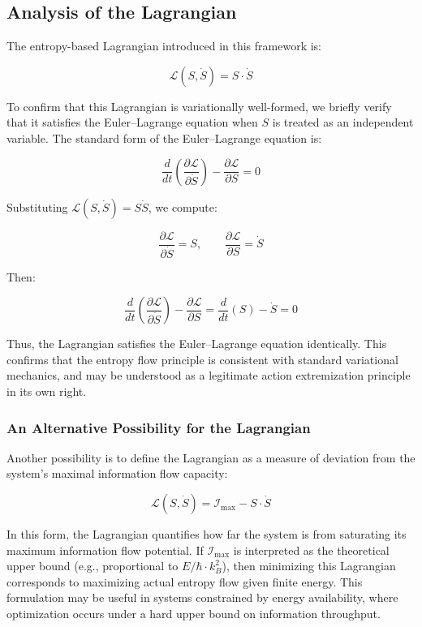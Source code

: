 \documentclass[12pt]{article}
\begin{document}
\subsection{Analysis of the Lagrangian}

The entropy-based Lagrangian introduced in this framework is:

\[
\mathcal{L}(S, \dot{S}) = S \cdot \dot{S}
\]

To confirm that this Lagrangian is variationally well-formed, we briefly verify that it satisfies the Euler--Lagrange equation when \( S \) is treated as an independent variable. The standard form of the Euler--Lagrange equation is:

\[
\frac{d}{dt} \left( \frac{\partial \mathcal{L}}{\partial \dot{S}} \right) - \frac{\partial \mathcal{L}}{\partial S} = 0
\]

Substituting \( \mathcal{L}(S, \dot{S}) = S \dot{S} \), we compute:

\[
\frac{\partial \mathcal{L}}{\partial \dot{S}} = S, \qquad \frac{\partial \mathcal{L}}{\partial S} = \dot{S}
\]

Then:

\[
\frac{d}{dt} \left( \frac{\partial \mathcal{L}}{\partial \dot{S}} \right) - \frac{\partial \mathcal{L}}{\partial S}
= \frac{d}{dt}(S) - \dot{S} = 0
\]

\noindent
Thus, the Lagrangian satisfies the Euler--Lagrange equation identically. This confirms that the entropy flow principle is consistent with standard variational mechanics, and may be understood as a legitimate action extremization principle in its own right.


\subsubsection{An Alternative Possibility for the Lagrangian}

Another possibility is to define the Lagrangian as a measure of deviation from the system’s maximal information flow capacity:

\[
\mathcal{L}(S, \dot{S}) = \mathcal{I}_{\text{max}} - S \cdot \dot{S}
\]

In this form, the Lagrangian quantifies how far the system is from saturating its maximum information flow potential. If \( \mathcal{I}_{\text{max}} \) is interpreted as the theoretical upper bound (e.g., proportional to \( E / \hbar \cdot k_B^2 \)), then minimizing this Lagrangian corresponds to maximizing actual entropy flow given finite energy. This formulation may be useful in systems constrained by energy availability, where optimization occurs under a hard upper bound on information throughput.
\end{document}
